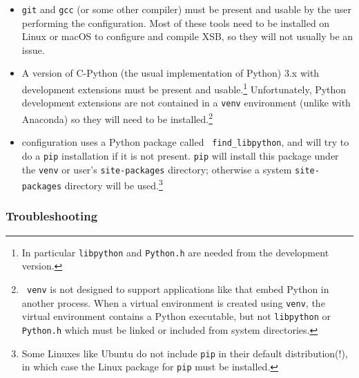 \begin{itemize}
\item {\tt git} and {\tt gcc} (or some other compiler) must be present
  and usable by the user performing the configuration.  Most of these
  tools need to be installed on Linux or macOS to configure and
  compile XSB, so they will not usually be an issue.

\item A version of C-Python (the usual implementation of Python) 3.x
  with development extensions must be present and usable.\footnote{In
    particular {\tt libpython} and {\tt Python.h} are needed from the
    development version.}  Unfortunately, Python development
  extensions are not contained in a {\tt venv} environment (unlike
  with Anaconda) so they will need to be installed.\footnote{{\tt
      venv} is not designed to support applications like \janusplg{}
    that embed Python in another process.  When a virtual environment
    is created using {\tt venv}, the virtual environment contains a
    Python executable, but not {\tt libpython} or {\tt Python.h} which
    must be linked or included from system directories.}

  \item \janusplg{} configuration uses a Python package called {\tt
    find\_libpython}, and will try to do a {\tt pip} installation if
    it is not present.  {\tt pip} will install this package under the
    {\tt venv} or user's {\tt site-packages} directory; otherwise a
    system {\tt site-packages} directory will be used.\footnote{Some
    Linuxes like Ubuntu do not include {\tt pip} in their default
    distribution(!), in which case the Linux package for {\tt pip}
    must be installed.}
\end{itemize}



\subsubsection{Troubleshooting}

%  

